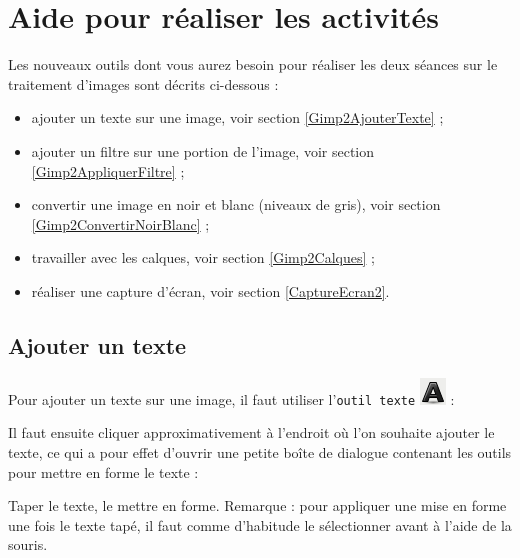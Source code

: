 
\newpage

\section{Aide pour réaliser les activités}\label{Image5eOutils}
 
Les nouveaux outils dont vous aurez besoin pour réaliser les deux séances sur le traitement d'images sont décrits ci-dessous :

\begin{itemize}   
\item ajouter un texte sur une image, voir section \vref{Gimp2AjouterTexte} ;
\item ajouter un filtre sur une portion de l'image, voir section \vref{Gimp2AppliquerFiltre} ;
\item convertir une image en noir et blanc (niveaux de gris), voir section \vref{Gimp2ConvertirNoirBlanc} ;
\item travailler avec les calques, voir section \vref{Gimp2Calques} ;   
\item réaliser une capture d'écran, voir section \vref{CaptureEcran2}.
\end{itemize}  



\subsection{Ajouter un texte}\label{Gimp2AjouterTexte}

Pour ajouter un texte sur une image, il faut utiliser l'\texttt{outil texte} \includegraphics[width=.6cm]{./images/image02/iconeTexte} :


Il faut ensuite cliquer approximativement à l'endroit où l'on souhaite ajouter le texte, ce qui a pour effet d'ouvrir une petite boîte de dialogue contenant les outils pour mettre en forme le texte :


Taper le texte, le mettre en forme. Remarque : pour appliquer une mise en forme une fois le texte tapé, il faut comme d'habitude le sélectionner avant à l'aide de la souris.


